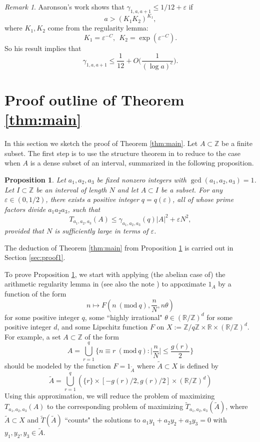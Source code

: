 \documentclass[12pt, notitlepage]{amsart}
\numberwithin{equation}{section}
\def\R{\mathbb R}
\def\Z{\mathbb Z}
\def\wt{\widetilde}
\def\gcd{\operatorname{gcd}}
\newcommand{\eps}{\varepsilon}
\newcommand{\Mod}[1]{\ (\mathrm{mod}\ #1)}
\newtheorem{proposition}[theorem]{Proposition}
\theoremstyle{remark}
\newtheorem{remark}[theorem]{Remark}
\theoremstyle{definition}
\theoremstyle{remark}
\numberwithin{equation}{section}
\begin{document}
\begin{remark}
Aaronson's work \cite{Aa} shows that $\gamma_{1,a,a+1} \leq 1/12+\eps$ if 
$$
a > (K_1K_2)^{K_1},
$$
where $K_1,K_2$ come from the regularity lemma:
$$
K_1 = \eps^{-C}, \ \ K_2 = \exp(\eps^{-C}).
$$
So his result implies that
$$
\gamma_{1,a,a+1} \leq \frac{1}{12} + O\Big(\frac{1}{(\log a)^c}\Big).
$$
\end{remark}


\section{Proof outline of Theorem \ref{thm:main}}\label{sec:pf-outline}

In this section we sketch the proof of Theorem \ref{thm:main}. Let $A \subset \Z$ be a finite subset. The first step is to use the structure theorem in \cite{green2008maximal} to reduce to the case when $A$ is a dense subset of an interval, summarized in the following proposition.

\begin{proposition}\label{prop:main-dense-case}
Let $a_1,a_2,a_3$ be fixed nonzero integers with $\gcd(a_1,a_2,a_3)=1$. Let $I \subset \Z$ be an interval of length $N$ and let $A \subset I$ be a subset. For any $\eps \in (0,1/2)$, there exists a positive integer $q = q(\eps)$, all of whose prime factors divide $a_1a_2a_3$, such that
$$
T_{a_1,a_2,a_3}(A) \leq \gamma_{a_1,a_2,a_3}(q)|A|^2 + \eps N^2,
$$
provided that $N$ is sufficiently large in terms of $\eps$.
\end{proposition}

The deduction of Theorem \ref{thm:main} from Proposition \ref{prop:main-dense-case} is carried out in Section \ref{sec:proof1}.

To prove Proposition \ref{prop:main-dense-case}, we start with applying (the abelian case of) the arithmetic regularity lemma in \cite{GreenTao-regularity} (see also the note \cite{Eberhard-note}) to appoximate $1_A$ by a function of the form
$$
n\mapsto F(n\Mod{q}, \frac{n}{N}, n\theta)
$$
for some positive integer $q$, some ``highly irrational" $\theta \in (\R/\Z)^d$ for some positive integer $d$, and some Lipschitz function $F$ on $X := \Z/q\Z \times \R \times (\R/\Z)^d$. For example, a set $A\subset \Z$ of the form
$$
A = \bigcup_{r=1}^q \Big\{n \equiv r\Mod{q}: \Big|\frac{n}{N}\Big| \leq \frac{g(r)}{2}\Big\}
$$
should be modeled by the function $F = 1_{\wt{A}}$ where $\wt{A} \subset X$ is defined by
\begin{equation}\label{eq:wtA}
\wt{A} = \bigcup_{r=1}^q \left(\{r\} \times [-g(r)/2,g(r)/2] \times (\R/\Z)^d\right)
\end{equation}
Using this approximation, we will reduce the problem of maximizing $T_{a_1,a_2,a_3}(A)$ to the corresponding problem of maximizing $\wt{T}_{a_1,a_2,a_3}(\wt{A})$, where $\wt{A} \subset X$ and $\wt{T}(\wt{A})$ ``counts" the solutions to $a_1y_1+a_2y_2+a_3y_3 = 0$ with $y_1,y_2,y_3 \in \wt{A}$.
\end{document}
